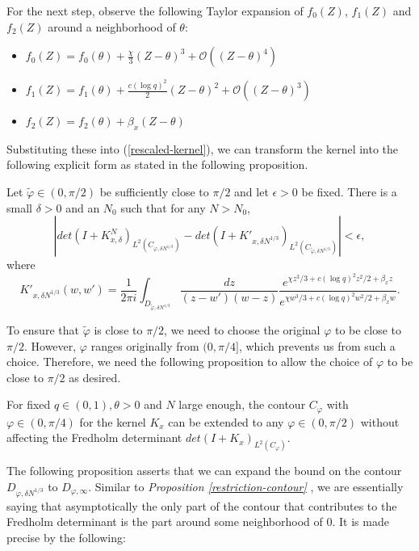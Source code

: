 For the next step, observe the following Taylor expansion of $f_0(Z)$, $f_1(Z)$ and $f_2(Z)$ around a neighborhood of $\theta$:
\begin{itemize}
\item $f_0(Z) = f_0(\theta) + \frac{\chi}{3} (Z - \theta)^3 + \mathcal{O}((Z - \theta)^4)$
\item $f_1(Z) = f_1(\theta) + \frac{c(\log q)^2}{2} (Z - \theta)^2 + \mathcal{O}((Z - \theta)^3)$
\item $f_2(Z) = f_2(\theta) + \beta_x (Z - \theta)$
\end{itemize}
Substituting these into (\ref{rescaled-kernel}), we can transform the kernel into the following explicit form as stated in the following proposition.

\begin{proposition} 
Let $\tilde{\varphi} \in (0, \pi / 2)$ be sufficiently close to $\pi / 2$ and let $\epsilon > 0$ be fixed. There is a small $\delta > 0$ and an $N_0$ such that for any $N > N_0$, $$|det(I +K_{x, \delta}^N )_{L^2(C_{\varphi, \delta N^{1/3}})} - det(I + K'_{x, \delta N^{1/3}})_{L^2(C_{\tilde{\varphi}, \delta N^{1/3}})}| < \epsilon,$$ where $$K'_{x,\delta N^{1/3}}(w,w') = \frac{1}{2 \pi i} \int_{D_{\tilde{\varphi}, \delta N^{1/3}}} \frac{dz}{(z-w')(w-z)} \frac{e^{\chi z^3 / 3 + c (\log q)^2 z^2 / 2 + \beta_x z}}{e^{\chi w^3 / 3 + c (\log q)^2 w^2 / 2 + \beta_x w}}.$$
\end{proposition}

To ensure that $\tilde{\varphi}$ is close to $\pi / 2$, we need to choose the original $\varphi$ to be close to $\pi / 2$. However, $\varphi$ ranges originally from $(0, \pi / 4]$, which prevents us from such a choice. Therefore, we need the following proposition to allow the choice of $\varphi$ to be close to $\pi / 2$ as desired. 

\begin{proposition} 
For fixed $q \in (0,1), \theta > 0$ and $N$ large enough, the contour $C_{\varphi}$ with $\varphi \in (0, \pi / 4)$ for the kernel $K_x$ can be extended to any $\varphi \in (0, \pi / 2)$ without affecting the Fredholm determinant $det(I+K_x)_{L^2(C_{\varphi})}$.
\end{proposition}

The following proposition asserts that we can expand the bound on the contour $D_{\varphi, \delta N^{1/3}}$ to $D_{\varphi, \infty}$. Similar to \textit{Proposition \ref{restriction-contour} }, we are essentially saying that asymptotically the only part of the contour that contributes to the Fredholm determinant is the part around some neighborhood of $0$. It is made precise by the following:

